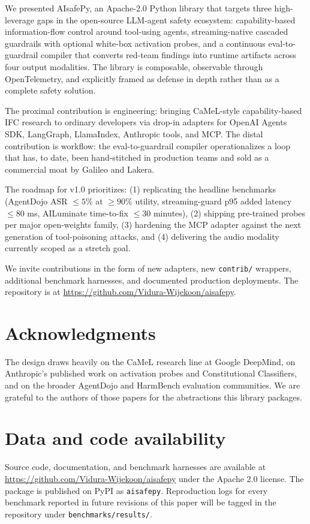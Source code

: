 We presented AIsafePy, an Apache-2.0 Python library that targets
three high-leverage gaps in the open-source LLM-agent safety
ecosystem: capability-based information-flow control around
tool-using agents, streaming-native cascaded guardrails with optional
white-box activation probes, and a continuous eval-to-guardrail
compiler that converts red-team findings into runtime artifacts
across four output modalities. The library is composable, observable
through OpenTelemetry, and explicitly framed as defense in depth
rather than as a complete safety solution.

The proximal contribution is engineering: bringing CaMeL-style
capability-based IFC research to ordinary developers via drop-in
adapters for OpenAI Agents SDK, LangGraph, LlamaIndex, Anthropic
tools, and MCP. The
distal contribution is workflow: the eval-to-guardrail compiler
operationalizes a loop that has, to date, been hand-stitched in
production teams and sold as a commercial moat by Galileo and
Lakera.

The roadmap for v1.0 prioritizes: (1) replicating the headline
benchmarks (AgentDojo ASR $\leq 5\%$ at $\geq 90\%$ utility,
streaming-guard p95 added latency $\leq 80$ ms, AILuminate
time-to-fix $\leq 30$ minutes), (2) shipping pre-trained probes
per major
open-weights family, (3) hardening the MCP adapter against the next
generation of tool-poisoning attacks, and (4) delivering the audio
modality currently scoped as a stretch goal.

We invite contributions in the form of new adapters, new
\texttt{contrib/} wrappers, additional benchmark harnesses, and
documented production deployments. The repository is at
\url{https://github.com/Vidura-Wijekoon/aisafepy}.

\section*{Acknowledgments}
The design draws heavily on the CaMeL research line at Google
DeepMind, on Anthropic's published work on activation probes and
Constitutional Classifiers, and on the broader AgentDojo and
HarmBench evaluation communities. We are grateful to the authors
of those papers for the abstractions this library packages.

\section*{Data and code availability}
Source code, documentation, and benchmark harnesses are available at
\url{https://github.com/Vidura-Wijekoon/aisafepy} under the Apache
2.0 license. The package is published on PyPI as \texttt{aisafepy}.
Reproduction logs for every benchmark reported in future revisions
of this paper will be tagged in the repository under
\texttt{benchmarks/results/}.
